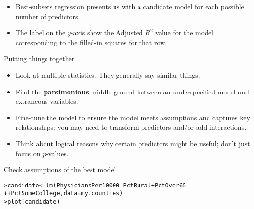 \documentclass{beamer}\usepackage[]{graphicx}\usepackage[]{color}
\makeatletter
\newcommand{\hlopt}[1]{\textcolor[rgb]{1,0.894,0.769}{#1}}%
\newcommand{\hlstd}[1]{\textcolor[rgb]{1,0.894,0.769}{#1}}%
\newcommand{\hlkwb}[1]{\textcolor[rgb]{0.804,0.776,0.451}{#1}}%
\newcommand{\hlkwc}[1]{\textcolor[rgb]{0.78,0.941,0.545}{#1}}%
\newcommand{\hlkwd}[1]{\textcolor[rgb]{1,0.78,0.769}{#1}}%
\newenvironment{kframe}{%
 \def\at@end@of@kframe{}%
 \ifinner\ifhmode%
  \def\at@end@of@kframe{\end{minipage}}%
  \begin{minipage}{\columnwidth}%
 \fi\fi%
 \def\FrameCommand##1{\hskip\@totalleftmargin \hskip-\fboxsep
 \colorbox{shadecolor}{##1}\hskip-\fboxsep
     \hskip-\linewidth \hskip-\@totalleftmargin \hskip\columnwidth}%
 \MakeFramed {\advance\hsize-\width
   \@totalleftmargin\z@ \linewidth\hsize
   \@setminipage}}%
 {\par\unskip\endMakeFramed%
 \at@end@of@kframe}
\newenvironment{knitrout}{}{} %
\makeatother
\begin{document}
\begin{darkframes}
    \begin{frame}
      \vspace{-1in}
\begin{knitrout}


\end{knitrout}
    \end{frame}

    \begin{frame}
      \begin{itemize}
        \item Best-subsets regression presents us with a candidate model for each possible number of predictors.
        \item The label on the $y$-axis show the Adjusted $R^2$ value for the model corresponding to the filled-in squares for that row.
      \end{itemize}
    \end{frame}

    \begin{frame}{Putting things together}
      \begin{itemize}[<+->]
        \item Look at multiple statistics. They generally say similar things.
        \item Find the \textbf{parsimonious} middle ground between an underspecified model and extraneous variables.
        \item Fine-tune the model to ensure the model meets assumptions and captures key relationships: you may need to transform predictors and/or add interactions.
        \item Think about logical reasons why certain predictors might be useful; don't just focus on $p$-values.
      \end{itemize}
    \end{frame}

    \begin{frame}[fragile]{Check assumptions of the best model}
      \fontsm

\begin{knitrout}
\begin{kframe}
\begin{alltt}
\hlstd{> }\hlstd{candidate} \hlkwb{<-} \hlkwd{lm}\hlstd{(PhysiciansPer10000} \hlopt{~} \hlstd{PctRural} \hlopt{+} \hlstd{PctOver65}
\hlstd{+ }                  \hlopt{+} \hlstd{PctSomeCollege,} \hlkwc{data}\hlstd{=my.counties)}
\hlstd{> }\hlkwd{plot}\hlstd{(candidate)}
\end{alltt}
\end{kframe}



\end{knitrout}
\end{frame}
\end{darkframes}
\end{document}
